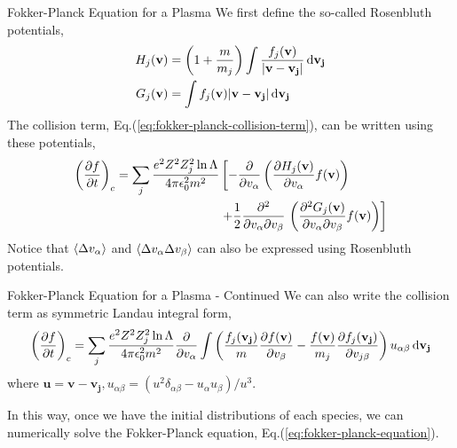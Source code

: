 \begin{frame}{Fokker-Planck Equation for a Plasma}
    We first define the so-called Rosenbluth potentials,
    \begin{equation}
        \begin{aligned}
            H_j(\mathbf{v}) & = \left(1+\frac{m}{m_j}\right)\int \frac{f_j(\mathbf{v})}{\abs{\mathbf{v-v_j}}}\dd{\mathbf{v_j}} \\
            G_j(\mathbf{v}) & = \int f_j(\mathbf{v})\abs{\mathbf{v-v_j}}\dd{\mathbf{v_j}}
        \end{aligned}
        \label{eq:rosenbluth-potentials}
    \end{equation}
    The collision term, Eq.(\ref{eq:fokker-planck-collision-term}), can be written using these potentials,
    \begin{equation}
        \begin{aligned}
            \left(\pdv{f}{t}\right)_c = \sum_j \frac{e^2Z^2Z_j^2\ln\Lambda}{4\pi\epsilon_0^2m^2}
             & \left[ -\pdv{v_\alpha}\left(\pdv{H_j(\mathbf{v})}{v_\alpha} f(\mathbf{v})\right)\right.                                         \\
             & \left. +\frac{1}{2}\pdv[2]{}{v_\alpha}{v_\beta}\,\left(\pdv[2]{G_j(\mathbf{v})}{v_\alpha}{v_\beta} f(\mathbf{v})\right) \right]
        \end{aligned}
        \label{eq:collision-term-rosenbluth}
    \end{equation}
    Notice that $\expval{\Delta v_\alpha}$ and $\expval{\Delta v_\alpha\Delta v_\beta}$ can also be expressed using Rosenbluth potentials.
\end{frame}

\begin{frame}{Fokker-Planck Equation for a Plasma - Continued}
    We can also write the collision term as symmetric Landau integral form,
    \begin{equation}
        \left(\pdv{f}{t}\right)_c = \sum_j \frac{e^2Z^2Z_j^2\ln\Lambda}{4\pi\epsilon_0^2m^2} \pdv{v_\alpha}
        \int \left(  \frac{f_j(\mathbf{v_j})}{m} \pdv{f(\mathbf{v})}{v_\beta} - \frac{f(\mathbf{v})}{m_j} \pdv{f_j(\mathbf{v_j})}{v_{j\beta}} \right) u_{\alpha\beta} \dd{\mathbf{v_j}}
        \label{eq:collision-term-landau-integral}
    \end{equation}
    where $\mathbf{u=v-v_j}, u_{\alpha\beta}=(u^2\delta_{\alpha\beta} - u_\alpha u_\beta)/u^3$.

    In this way, once we have the initial distributions of each species, we can numerically solve the Fokker-Planck equation, Eq.(\ref{eq:fokker-planck-equation}).
\end{frame}

